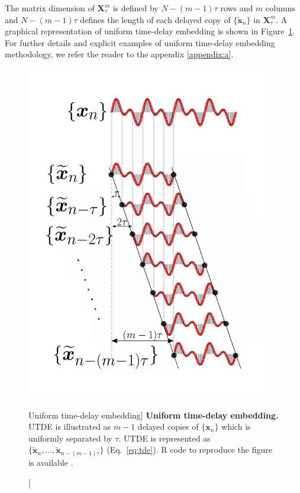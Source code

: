 The matrix dimension of $ \boldsymbol{X}_{\tau}^{m} $ is defined by
$N-(m-1)\tau$ rows and $m$ columns and $N-(m-1)\tau$ defines the length of 
each delayed copy 
of $\{ \boldsymbol{ \tilde{x} }_n \}$ in $\boldsymbol{X}^{m}_{\tau}$.
A graphical representation of uniform time-delay embedding is shown in 
Figure~\ref{fig:utde}. For further details and explicit examples of uniform 
time-delay embedding methodology, we refer the reader to the appendix 
\ref{appendix:a}.
\begin{figure}
 \centering
   \includegraphics[width=0.95\textwidth]{utde}
   \caption
	[Uniform time-delay embedding]{
	{\bf Uniform time-delay embedding.} 
	UTDE is illustrated as $m-1$ delayed copies
   	of $\{ \boldsymbol{x}_n \}$ which is uniformly separated by $\tau$.
	UTDE is represented as
	$\{ \boldsymbol{ \tilde{x} }_n, \dots,  
	\boldsymbol{ \tilde{x} }_{n -(m-1)\tau}   \}$ (Eq.~\ref{eq:tde}).
	R code to reproduce the figure is available \cite{hwum2018}.
   }
   \label{fig:utde}
\end{figure}
